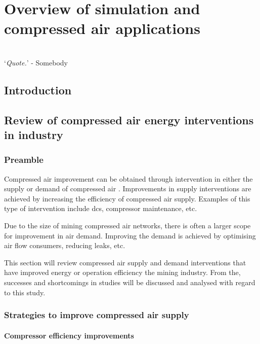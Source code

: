 \chapter{Overview of simulation and compressed air applications}
\thispagestyle{empty}
\vspace{38em}
\hrulefill
\\
\enquote*{\textit{Quote.}} - Somebody\\
\clearpage
\section{Introduction}
\section{Review of compressed air energy interventions in industry}
	\subsection{Preamble}
		Compressed air improvement can be obtained through intervention in either the supply or demand of compressed air \cite{Kriel2014Masters}. Improvements in supply interventions are achieved by increasing the efficiency of compressed air supply. Examples of this type of intervention include \gls{dcs}, compressor maintenance, etc. 
		\par
		Due to the size of mining compressed air networks, there is often a larger scope for improvement in air demand. Improving the demand is achieved by optimising air flow consumers, reducing leaks, etc.
		\par
	 	 This section will review compressed air supply and demand interventions that have improved energy or operation efficiency the mining industry. From the, successes and shortcomings in studies will be discussed and analysed with regard to this study.
	 	
	\subsection{Strategies to improve compressed air supply}

		\subsubsection{Compressor efficiency improvements}
